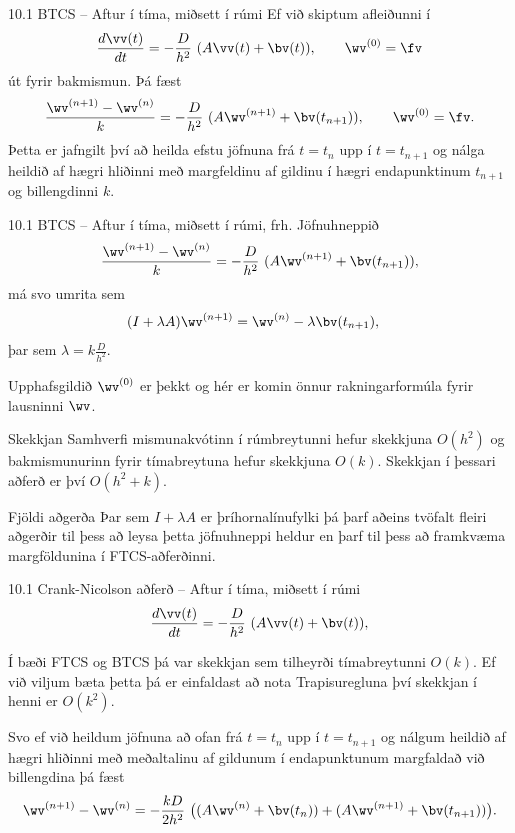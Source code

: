 \begin{frame}{10.1 BTCS -- Aftur í tíma, miðsett í rúmi}
Ef við skiptum afleiðunni í 
$$ 
 \frac{d \vv(t)}{d t} =  -\frac{D}{h^2}\  (A\vv(t) + \bv(t)), \qquad \wv^{(0)}=\fv
$$
út fyrir bakmismun. Þá fæst
$$ 
 \frac{\wv^{(n+1)} - \wv^{(n)}}{ k} =  -\frac{D}{h^2}\  (A\wv^{(n+1)} + \bv(t_{n+1})), 
 \qquad \wv^{(0)}=\fv.
$$\pause
Þetta er jafngilt því að heilda efstu jöfnuna frá $t=t_n$ upp í $t=t_{n+1}$ og
nálga heildið af hægri hliðinni með margfeldinu af gildinu í hægri endapunktinum 
$t_{n+1}$ og billengdinni $k$. \pause

\end{frame}
 
\begin{frame}{10.1 BTCS -- Aftur í tíma, miðsett í rúmi, frh.}
 Jöfnuhneppið
 $$ 
 \frac{\wv^{(n+1)} - \wv^{(n)}}{ k} =  -\frac{D}{h^2}\  (A\wv^{(n+1)} + \bv(t_{n+1})), 
$$
má svo umrita sem
\begin{align*}
 (I+\lambda A)\wv^{(n+1)} &= \wv^{(n)}  - \lambda \bv(t_{n+1}), 
\end{align*}
þar sem $\lambda = k\frac{D}{h^2}$. \pause
 
 Upphafsgildið $\wv^{(0)}$ er þekkt og hér er komin önnur rakningarformúla
 fyrir lausninni $\wv$.  \pause
 
 \begin{block}{Skekkjan}
  Samhverfi mismunakvótinn í rúmbreytunni hefur skekkjuna
 $O(h^2)$ og bakmismunurinn fyrir tímabreytuna hefur skekkjuna $O(k)$. 
 Skekkjan í þessari aðferð er því $O(h^2 + k)$.
 \end{block}
 
 \begin{block}{Fjöldi aðgerða}
  Þar sem $I+\lambda A$ er þríhornalínufylki þá þarf aðeins tvöfalt fleiri
  aðgerðir til þess að leysa þetta jöfnuhneppi heldur en þarf til þess að framkvæma margföldunina
  í FTCS-aðferðinni.
 \end{block}

 
 \end{frame}
 
\begin{frame}{10.1 Crank-Nicolson aðferð -- Aftur í tíma, miðsett í rúmi}
$$ 
 \frac{d \vv(t)}{d t} =  -\frac{D}{h^2}\  (A\vv(t) + \bv(t)),
$$

Í bæði FTCS og BTCS þá var skekkjan sem tilheyrði tímabreytunni $O(k)$.
Ef við viljum bæta þetta þá er einfaldast að nota Trapisuregluna
því skekkjan í henni er $O(k^2)$. \pause 

Svo ef við heildum jöfnuna að ofan frá $t=t_n$ upp í $t=t_{n+1}$ og
nálgum heildið af hægri hliðinni með meðaltalinu af gildunum í endapunktunum
margfaldað við billengdina
þá fæst
$$ 
 \wv^{(n+1)} - \wv^{(n)} =  -\frac{kD}{2h^2}\  
 \big( (A\wv^{(n)} + \bv(t_{n})) +  
 (A\wv^{(n+1)} + \bv(t_{n+1})) \big).
$$
\end{frame}
 
